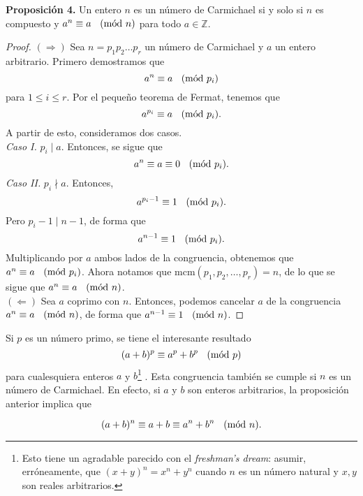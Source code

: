 \documentclass{article}
\theoremstyle{definition}
\newcommand{\Mod}[1]{\ \hspace{0.2cm} (\mathrm{m\acute{o}d}\ #1)}
\begin{document}
\begin{mybox2}
	\textbf{Proposición 4. } Un entero $n$ es un número de Carmichael si y solo si $n$ es compuesto y $a^n \equiv a \Mod{n}$ para todo $a \in \mathbb{Z}$.
\end{mybox2}	
\begin{proof}
	$(\Rightarrow)$ Sea $n = p_{1} p_{2} \ldots p_{r}$ un número de Carmichael y $a$ un entero arbitrario. Primero demostramos que
	$$ a^{n} \equiv a \Mod{p_{i}} $$
	para $1 \leq i \leq r.$ Por el pequeño teorema de Fermat, tenemos que 
	$$ a^{p_{i}} \equiv a \Mod{p_{i}} .$$ 
	A partir de esto, consideramos dos casos. \\
	
	\textit{Caso I. } $p_{i} \mid a$. Entonces, se sigue que
	$$ a^{n} \equiv a \equiv 0 \Mod{p_{i}} .$$
	\textit{Caso II. } $p_{i} \nmid a .$ Entonces, 
	$$ a^{p_{i} - 1} \equiv 1 \Mod{p_{i}}. $$
	Pero $p_{i} - 1 \mid n - 1$, de forma que
	$$ a^{n - 1} \equiv 1 \Mod{p_{i}}. $$
	Multiplicando por $a$ ambos lados de la congruencia, obtenemos que $a^{n} \equiv a \Mod{p_{i}}$. Ahora notamos que $\text{mcm}(p_{1}, p_{2}, \ldots , p_{r}) = n$, de lo que se sigue que $a^{n} \equiv a \Mod{n}$. \\
	
	$(\Leftarrow)$ Sea $a$ coprimo con $n$. Entonces, podemos cancelar $a$ de la congruencia $a^{n} \equiv a \Mod{n}$, de forma que $ a^{n-1} \equiv 1 \Mod{n}$.
\end{proof}
\vspace{0.5cm}
Si $p$ es un número primo, se tiene el interesante resultado
$$ (a + b)^{p} \equiv a^{p} + b^{p} \Mod{p} $$
para cualesquiera enteros $a$ y $b$\footnote{Esto tiene un agradable parecido con el \textit{freshman's dream}: asumir, erróneamente, que  $  (x + y)^{n} = x^n + y^n$ cuando $n$ es un número natural  y $x, y$ son reales arbitrarios. } .  Esta congruencia también se cumple  si $n$ es un número de Carmichael. En efecto, si $a$ y $b$ son enteros arbitrarios, la proposición anterior implica que

$$ (a + b)^{n} \equiv a + b \equiv a^{n} + b^{n} \Mod{n}.$$

\newpage
\end{document}
